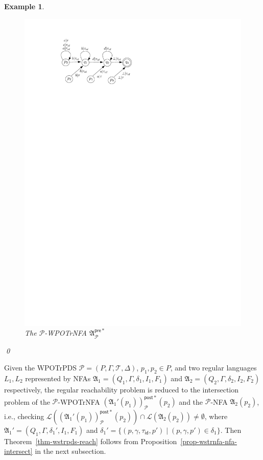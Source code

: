 \documentclass[preprint,12pt]{elsarticle}
\newtheorem{example}{Example}
\newcommand\Pp{{\mathcal{P} }}
\newcommand\pre{{\mathsf{pre} }}
\newcommand\post{{\mathsf{post} }}
\newcommand{\id}{\mathsf{id}}
\newcommand\Aut{{\mathfrak{A} }}
\newcommand\Lang{{\mathscr{L} }}
\newcommand\TranSet{{\mathscr{T} }}
\newcommand{\WOTrPDS}{\textsf{WPOTrPDS}}
\newcommand{\WOTrNFA}{\textsf{WPOTrNFA}}
\newcommand{\NFA}{\textsf{NFA}}
\begin{document}
\begin{example}
\begin{figure}[htb]
	\includegraphics[scale = 0.9]{saturation-example.pdf}
	\caption{The $\Pp$-{\WOTrNFA} $\Aut^{\pre*}_{\Pp}$}\label{fig-saturation-exmp}
\end{figure}
\qed
\end{example}

Given the {\WOTrPDS} $\Pp= (P, \Gamma, \TranSet, \Delta)$, $p_1, p_2 \in P$, and two regular languages $L_1, L_2$ represented by {\NFA}s $\Aut_1 = (Q_1, \Gamma, \delta_1, I_1, F_1)$ and $\Aut_2 = (Q_2, \Gamma, \delta_2, I_2, F_2)$ respectively, the regular reachability problem is reduced to the intersection problem of the $\Pp$-{\WOTrNFA} $(\Aut_1'(p_1))^{\post*}_{\Pp}(p_2)$ and the $\Pp$-{\NFA} $\Aut_2(p_2)$, 
i.e., checking $\Lang((\Aut_1'(p_1))^{\post*}_{\Pp}(p_2)) \cap \Lang(\Aut_2(p_2)) \neq \emptyset$, where $\Aut_1' = (Q_1, \Gamma, \delta_1', I_1, F_1)$ and $\delta_1' = \{(p,\gamma,\tau_{\id}, p')\mid (p,\gamma,p')\in\delta_1\}$.
Then Theorem~\ref{thm-wstrpds-reach} follows from Proposition~\ref{prop-wstrnfa-nfa-intersect} in the next subsection.
\end{document}
